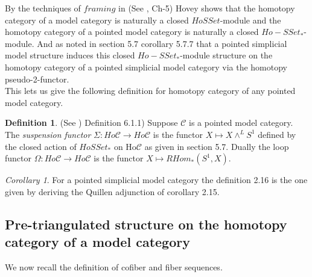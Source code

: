 \documentclass{article}
\newcommand{\cC}{\mathcal{C}}
\theoremstyle{definition}
\newtheorem{definition}[theorem]{Definition}
\theoremstyle{remark}
\newtheorem{corollary}[theorem]{Corollary}
\begin{document}
By the techniques of $framing$ in (See \cite{MR1650134}, Ch-5) Hovey shows that the homotopy category of a model category is naturally a closed $Ho SSet$-module and the homotopy category of a pointed model category is naturally a closed $Ho-SSet_{*}$-module.
And as noted in section 5.7 corollary 5.7.7 that a pointed simplicial model structure induces this closed $Ho-SSet_{*}$-module structure on the homotopy category of a pointed simplicial model category via the homotopy pseudo-2-functor.
\\This lets us give the following definition for homotopy category of any pointed model category. 
\begin{definition}
    (See \cite{MR1650134}) Definition 6.1.1) Suppose $\cC$ is a pointed model category. The \textit{suspension functor} $\Sigma: Ho \cC \rightarrow Ho\cC$ is the functor $X \mapsto X \wedge^{L} S^1$ defined by the closed action of $HoSSet_{*}$ on Ho$\cC$ as given in section 5.7. Dually the loop functor $\Omega: Ho \cC \rightarrow Ho\cC$ is the functor $X \mapsto RHom_{*}(S^{1},X)$.
\end{definition}
\begin{corollary} \label{cor:Quiequvforsimpstab}
    For a pointed simplicial model category the definition 2.16 is the one given by deriving the Quillen adjunction of corollary 2.15.
\end{corollary}

\subsection*{Pre-triangulated structure on the homotopy category of a model category}
We now recall the definition of cofiber and fiber sequences.
\end{document}
